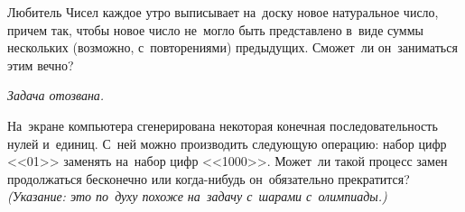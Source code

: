 \begin{problems}
\item
Любитель Чисел каждое утро выписывает на~доску новое натуральное число, причем
так, чтобы новое число не~могло быть представлено в~виде суммы нескольких
(возможно, с~повторениями) предыдущих.
Сможет~ли он~заниматься этим вечно?

\item
\emph{Задача отозвана.}

\item
На~экране компьютера сгенерирована некоторая конечная последовательность нулей
и~единиц.
С~ней можно производить следующую операцию: набор цифр <<01>> заменять на~набор
цифр <<1000>>.
Может~ли такой процесс замен продолжаться бесконечно или когда-нибудь
он~обязательно прекратится?
\emph{(Указание: это по~духу похоже на~задачу с~шарами с~олимпиады.)}

\end{problems}

